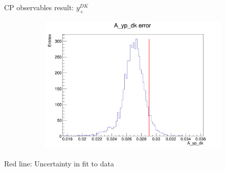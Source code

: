 \documentclass{beamer}
\begin{document}
\begin{frame}{CP observables result: $y_+^{DK}$}
\begin{figure}
\begin{subfigure}{0.42\textwidth}
      \includegraphics[width = 1.0\textwidth]{Plots/A_yp_dk_error_WithDataUncertainty.png}
    \end{subfigure}
  \end{figure}
  \begin{center}
    Red line: Uncertainty in fit to data
  \end{center}
\end{frame}
\end{document}
